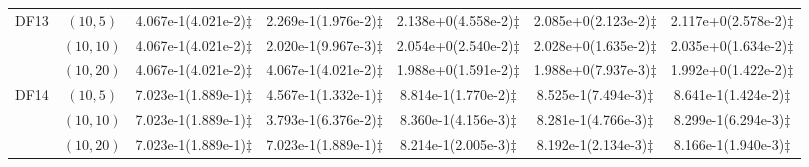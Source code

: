 \documentclass[review]{elsarticle}
\begin{document}
\begin{table*}[!htb]
{\begin{tabular}{ccccccc}
\hline  \multirow{3}{*}{DF13}
&$(10,5)$ &4.067e-1(4.021e-2)$\ddagger$ &2.269e-1(1.976e-2)$\ddagger$ &2.138e+0(4.558e-2)$\ddagger$ &2.085e+0(2.123e-2)$\ddagger$ &2.117e+0(2.578e-2)$\ddagger$ \\
&$(10,10)$ &4.067e-1(4.021e-2)$\ddagger$ &2.020e-1(9.967e-3)$\ddagger$ &2.054e+0(2.540e-2)$\ddagger$ &2.028e+0(1.635e-2)$\ddagger$ &2.035e+0(1.634e-2)$\ddagger$ \\
&$(10,20)$ &4.067e-1(4.021e-2)$\ddagger$ &4.067e-1(4.021e-2)$\ddagger$ &1.988e+0(1.591e-2)$\ddagger$ &1.988e+0(7.937e-3)$\ddagger$ &1.992e+0(1.422e-2)$\ddagger$ \\
\hline  \multirow{3}{*}{DF14}
&$(10,5)$ &7.023e-1(1.889e-1)$\ddagger$ &4.567e-1(1.332e-1)$\ddagger$ &8.814e-1(1.770e-2)$\ddagger$ &8.525e-1(7.494e-3)$\ddagger$ &8.641e-1(1.424e-2)$\ddagger$ \\
&$(10,10)$ &7.023e-1(1.889e-1)$\ddagger$ &3.793e-1(6.376e-2)$\ddagger$ &8.360e-1(4.156e-3)$\ddagger$ &8.281e-1(4.766e-3)$\ddagger$ &8.299e-1(6.294e-3)$\ddagger$ \\
&$(10,20)$ &7.023e-1(1.889e-1)$\ddagger$ &7.023e-1(1.889e-1)$\ddagger$ &8.214e-1(2.005e-3)$\ddagger$ &8.192e-1(2.134e-3)$\ddagger$ &8.166e-1(1.940e-3)$\ddagger$ \\

\hline
\end{tabular}}



\end{table*}
\end{document}

